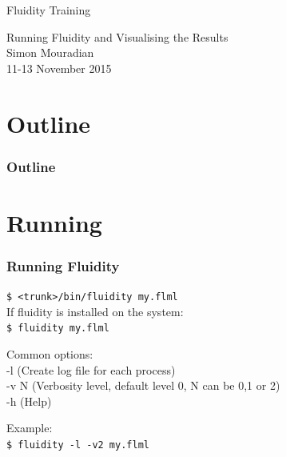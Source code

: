 \documentclass[12pt]{beamer}
\begin{document}
 
\begin{frame}{Fluidity Training}
  \begin{center}
  {\Large Running Fluidity and Visualising the Results}
  \vspace{1.5cm}\\
  \large Simon Mouradian\\
  \vspace{0.2cm}
  11-13 November 2015
  \end{center}
\end{frame}

\section*{Outline}
\begin{frame}
  \frametitle{Outline}
  \tableofcontents
\end{frame}

\section{Running}
\begin{frame}
    \frametitle{Running Fluidity}

\texttt{\$ <trunk>/bin/fluidity my.flml}\\
\vspace{1ex}
If fluidity is installed on the system:\\
\texttt{\$ fluidity my.flml}

\vspace{1ex}
Common options:\\
-l \qquad (Create log file for each process)\\
-v N \qquad (Verbosity level, default level 0, N can be 0,1 or 2)\\
-h \qquad (Help)
\vspace{1ex}

Example:\\
\texttt{\$ fluidity -l -v2 my.flml}

\end{frame}


\end{document}
